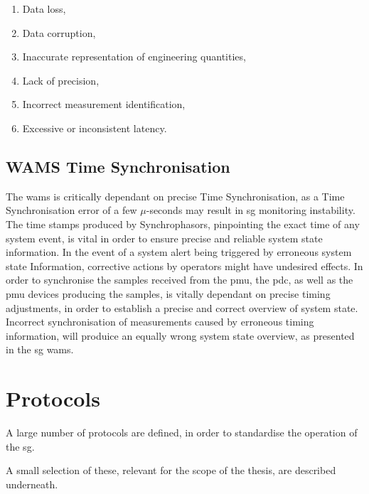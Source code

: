 \begin{enumerate}




    \item Data loss,
    \item Data corruption,
    \item Inaccurate representation of engineering quantities,
    \item Lack of precision,
    \item Incorrect measurement identification,
    \item Excessive or inconsistent latency.

\end{enumerate}






\subsection{WAMS Time Synchronisation}



The \acrlong{wams} is critically dependant on precise Time Synchronisation, as a Time Synchronisation error of a few $\mu$-seconds may result in \acrshort{sg} monitoring instability. The time stamps produced by Synchrophasors, pinpointing the exact time of any system event, is vital in order to ensure precise and reliable system state information.
In the event of a system alert being triggered by erroneous system state Information, corrective actions by operators might have undesired effects. In order to synchronise the samples received from the \acrshort{pmu}, the \acrshort{pdc}, as well as the \acrshort{pmu} devices producing the samples, is vitally dependant on precise timing adjustments, in order to establish a precise and correct overview of system state. Incorrect synchronisation of measurements caused by erroneous timing information, will produice an equally wrong system state overview, as presented in the \acrshort{sg} \acrshort{wams}. \\ 


\section{Protocols}
A large number of protocols are defined, in order to standardise the operation of the \acrlong{sg}.

A small selection of these, relevant for the scope of the thesis, are described underneath.


